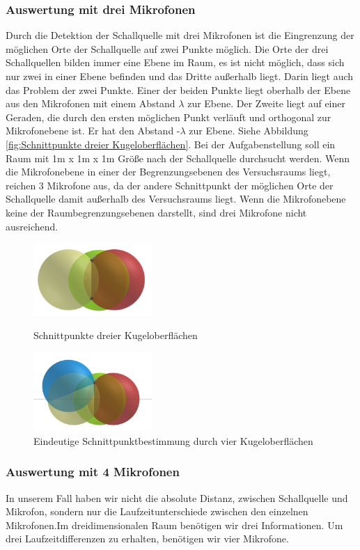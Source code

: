 \subsubsection{Auswertung mit drei Mikrofonen}

Durch die Detektion der Schallquelle mit drei Mikrofonen ist die Eingrenzung der möglichen Orte der Schallquelle auf zwei Punkte möglich. Die Orte der drei Schallquellen bilden immer eine Ebene im Raum, es ist nicht möglich, dass sich nur zwei in einer Ebene befinden und das Dritte außerhalb liegt. Darin liegt auch das Problem der zwei Punkte. Einer der beiden Punkte liegt oberhalb der Ebene aus den Mikrofonen mit einem Abstand $\lambda$ zur Ebene. Der Zweite liegt auf einer Geraden, die durch den ersten möglichen Punkt verläuft und orthogonal zur Mikrofonebene ist. Er hat den Abstand -$\lambda$ zur Ebene. Siehe Abbildung \ref{fig:Schnittpunkte dreier Kugeloberflächen}.
Bei der Aufgabenstellung soll ein Raum mit 1m x 1m x 1m Größe nach der Schallquelle durchsucht werden. Wenn die Mikrofonebene in einer der Begrenzungsebenen des Versuchsraums liegt, reichen 3 Mikrofone aus, da der andere Schnittpunkt der möglichen Orte der Schallquelle damit außerhalb des Versuchsraums liegt. Wenn die Mikrofonebene keine der Raumbegrenzungsebenen darstellt, sind drei Mikrofone nicht ausreichend. 
\begin{figure}
\centering 
\includegraphics[width=0.4\textwidth]{3Kugeln}
\caption{Schnittpunkte dreier Kugeloberflächen}\label{fig:Schnittpunkte dreier Kugeloberflächen}
\includegraphics[width=0.4\textwidth]{4Kugeln}
\caption{Eindeutige Schnittpunktbestimmung durch vier Kugeloberflächen}\label{fig:Eindeutige Schnittpunktbestimmung durch vier Kugeloberflächen}
\end{figure}
\subsubsection{Auswertung mit 4 Mikrofonen}
In unserem Fall haben wir nicht die absolute Distanz, zwischen Schallquelle und Mikrofon, sondern nur die Laufzeitunterschiede zwischen den einzelnen Mikrofonen.Im dreidimensionalen Raum benötigen wir drei Informationen. Um drei Laufzeitdifferenzen zu erhalten, benötigen wir vier Mikrofone. 

